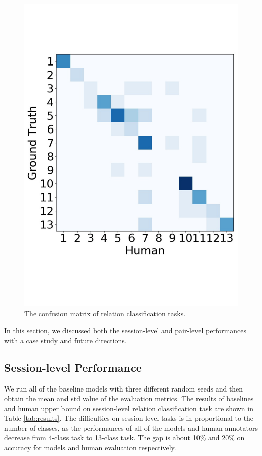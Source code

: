 \begin{figure}
{\begin{minipage}{0.25\linewidth}
			\includegraphics[width=1\linewidth]{human_13_pair}
	\end{minipage}}
	\vspace{-1cm}
	\caption{The confusion matrix of relation classification tasks.}
	\label{fig:confusion}
\end{figure}
In this section, we discussed both the session-level and pair-level performances with a case study and future directions.
\subsection{Session-level Performance}
We run all of the baseline models with three different random seeds and then obtain the mean and
std value of the evaluation metrics. The results of baselines and human upper bound on session-level relation classification task 
are shown in Table \ref{tab:results}. The difficulties on session-level tasks is in proportional to the number of classes, as the performances of all of the models and human annotators decrease from 4-class task to 13-class task. The gap is about 10\% and 20\% on accuracy for models and human evaluation respectively. 

